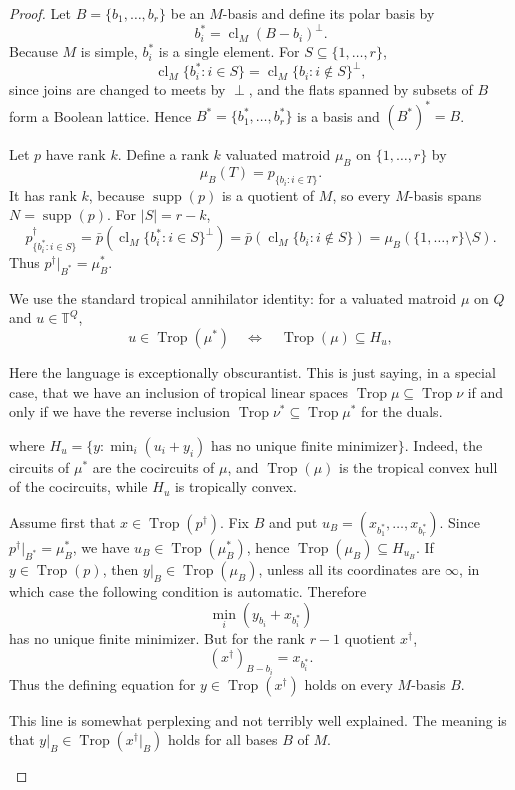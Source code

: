 \documentclass[12pt]{article}
\theoremstyle{definition}
\newcommand{\T}{\mathbb T}
\newcommand{\Trop}{\operatorname{Trop}}
\newcommand{\cl}{\operatorname{cl}}
\newcommand{\supp}{\operatorname{supp}}
\newcommand{\review}[1]{\begin{reviewbox}#1\end{reviewbox}}
\begin{document}
\begin{proof}
Let \(B=\{b_1,\ldots,b_r\}\) be an \(M\)-basis and define its polar basis by
\[
b_i^*=\cl_M(B-b_i)^\perp.
\]
Because \(M\) is simple, \(b_i^*\) is a single element.  For \(S\subseteq\{1,\ldots,r\}\),
\[
\cl_M\{b_i^*:i\in S\}
=
\cl_M\{b_i:i\notin S\}^{\perp},
\]
since joins are changed to meets by \(\perp\), and the flats spanned by subsets of \(B\) form a Boolean lattice.  Hence \(B^*=\{b_1^*,\ldots,b_r^*\}\) is a basis and \((B^*)^*=B\).

Let \(p\) have rank \(k\).  Define a rank \(k\) valuated matroid \(\mu_B\) on \(\{1,\ldots,r\}\) by
\[
\mu_B(T)=p_{\{b_i:i\in T\}}.
\]
It has rank \(k\), because \(\supp(p)\) is a quotient of \(M\), so every \(M\)-basis spans \(N=\supp(p)\).  For \(|S|=r-k\),
\[
p^\dagger_{\{b_i^*:i\in S\}}
=
\bar p\!\left(\cl_M\{b_i^*:i\in S\}^{\perp}\right)
=
\bar p\!\left(\cl_M\{b_i:i\notin S\}\right)
=
\mu_B(\{1,\ldots,r\}\setminus S).
\]
Thus \(p^\dagger|_{B^*}=\mu_B^*\).

We use the standard tropical annihilator identity: for a valuated matroid \(\mu\) on \(Q\) and \(u\in\T^Q\),
\[
u\in\Trop(\mu^*)\quad\Longleftrightarrow\quad
\Trop(\mu)\subseteq H_u,
\]
\review{Here the language is exceptionally obscurantist. This is just saying, in a special case, that we have an inclusion of tropical linear spaces $\Trop \mu \subseteq \Trop \nu$ if and only if we have the reverse inclusion $\Trop \nu^* \subseteq \Trop \mu^*$ for the duals.}
where \(H_u=\{y:\min_i(u_i+y_i)\text{ has no unique finite minimizer}\}\).  Indeed, the circuits of \(\mu^*\) are the cocircuits of \(\mu\), and \(\Trop(\mu)\) is the tropical convex hull of the cocircuits, while \(H_u\) is tropically convex.

Assume first that \(x\in\Trop(p^\dagger)\).  Fix \(B\) and put \(u_B=(x_{b_1^*},\ldots,x_{b_r^*})\).  Since \(p^\dagger|_{B^*}=\mu_B^*\), we have \(u_B\in\Trop(\mu_B^*)\), hence \(\Trop(\mu_B)\subseteq H_{u_B}\).  If \(y\in\Trop(p)\), then \(y|_B\in\Trop(\mu_B)\), unless all its coordinates are \(\infty\), in which case the following condition is automatic.  Therefore
\[
\min_i(y_{b_i}+x_{b_i^*})
\]
has no unique finite minimizer.  But for the rank \(r-1\) quotient \(x^\dagger\),
\[
(x^\dagger)_{B-b_i}=x_{b_i^*}.
\]
Thus the defining equation for \(y\in\Trop(x^\dagger)\) holds on every \(M\)-basis \(B\).
\review{This line is somewhat perplexing and not terribly well explained. The meaning is that $y|_B \in \Trop(x^{\dagger}|_B)$ holds for all bases $B$ of $M$.}


\end{proof}
\end{document}
